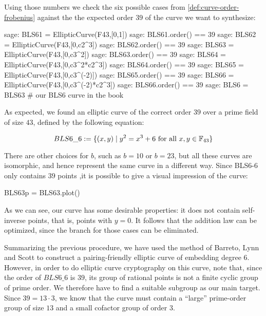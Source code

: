 Using those numbers we check the six possible cases from \ref{def:curve-order-frobenius} against the the expected order $39$ of the curve we want to synthesize:

\begin{sagecommandline}
sage: BLS61 = EllipticCurve(F43,[0,1])
sage: BLS61.order() == 39
sage: BLS62 = EllipticCurve(F43,[0,c2^3])
sage: BLS62.order() == 39
sage: BLS63 = EllipticCurve(F43,[0,c3^2])
sage: BLS63.order() == 39
sage: BLS64 = EllipticCurve(F43,[0,c3^2*c2^3])
sage: BLS64.order() == 39
sage: BLS65 = EllipticCurve(F43,[0,c3^(-2)])
sage: BLS65.order() == 39
sage: BLS66 = EllipticCurve(F43,[0,c3^(-2)*c2^3])
sage: BLS66.order() == 39
sage: BLS6 = BLS63 # our BLS6 curve in the book
\end{sagecommandline}
As expected, we found an elliptic curve of the correct order $39$ over a prime field of size $43$, defined by the following equation:

\begin{equation}
BLS6\_6 := \{(x,y)\;|\; y^2 = x^3 + 6 \text{ for all } x,y \in \mathbb{F}_{43}\}
\end{equation}

There are other choices for $b$, such as $b=10$ or $b=23$, but all these curves are isomorphic, and hence represent the same curve in a different way. Since BLS6-6 only contains $39$ points ,it is possible to give a visual impression of the curve:

\begin{sagesilent}
BLS63p = BLS63.plot()
\end{sagesilent}
\begin{center} 
\end{center}

As we can see, our curve has some desirable properties: it does not contain self-inverse points, that is, points with $y=0$. It follows that the addition law can be optimized, since the branch for those cases can be eliminated. 

Summarizing the previous procedure, we have used the method of Barreto, Lynn and Scott to construct a pairing-friendly elliptic curve of embedding degree $6$. However, in order to do elliptic curve cryptography on this curve, note that, since the order of $BLS6\_6$ is $39$, its group of rational points is not a finite cyclic group of prime order. We therefore have to find a suitable subgroup as our main target. Since $39=13\cdot 3$, we know that the curve must contain a ``large'' prime-order group of size $13$ and a small cofactor group of order $3$. 


